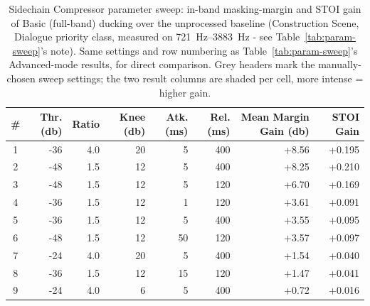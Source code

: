 \begin{table}[h]
\centering
\footnotesize
\caption{Sidechain Compressor parameter sweep: in-band masking-margin and STOI
gain of Basic (full-band) ducking over the unprocessed baseline
(Construction Scene, Dialogue priority class, measured on
\SI{721}{\hertz}--\SI{3883}{\hertz} - see Table~\ref{tab:param-sweep}'s
note). Same settings and row numbering as Table~\ref{tab:param-sweep}'s
Advanced-mode results, for direct comparison. Grey headers mark the
manually-chosen sweep settings; the two result columns are shaded per
cell, more intense = higher gain.}
\label{tab:param-sweep-basic}
\begin{tabular}{@{}c r r r r r r r@{}}
\toprule
\cellcolor{paramgrey}\textbf{\#} & \cellcolor{paramgrey}\textbf{Thr.} (\si{\decibel}) & \cellcolor{paramgrey}\textbf{Ratio} & \cellcolor{paramgrey}\textbf{Knee} (\si{\decibel}) & \cellcolor{paramgrey}\textbf{Atk.} (\si{\milli\second}) & \cellcolor{paramgrey}\textbf{Rel.} (\si{\milli\second}) & \textbf{Mean Margin Gain} (\si{\decibel}) & \textbf{STOI Gain} \\
\midrule
1 & -36 & 4.0 & 20 & 5  & 400 & \cellcolor{green!70}+8.56 & \cellcolor{yellow!66}+0.195 \\
2 & -48 & 1.5 & 12 & 5  & 400 & \cellcolor{green!68}+8.25 & \cellcolor{yellow!70}+0.210 \\
3 & -48 & 1.5 & 12 & 5  & 120 & \cellcolor{green!57}+6.70 & \cellcolor{yellow!58}+0.169 \\
4 & -36 & 1.5 & 12 & 1  & 120 & \cellcolor{green!35}+3.61 & \cellcolor{yellow!36}+0.091 \\
5 & -36 & 1.5 & 12 & 5  & 400 & \cellcolor{green!35}+3.55 & \cellcolor{yellow!37}+0.095 \\
6 & -48 & 1.5 & 12 & 50 & 120 & \cellcolor{green!35}+3.57 & \cellcolor{yellow!38}+0.097 \\
7 & -24 & 4.0 & 20 & 5  & 400 & \cellcolor{green!21}+1.54 & \cellcolor{yellow!22}+0.040 \\
8 & -36 & 1.5 & 12 & 15 & 120 & \cellcolor{green!20}+1.47 & \cellcolor{yellow!22}+0.041 \\
9 & -24 & 4.0 & 6  & 5  & 400 & \cellcolor{green!15}+0.72 & \cellcolor{yellow!15}+0.016 \\
\bottomrule
\end{tabular}
\end{table}
